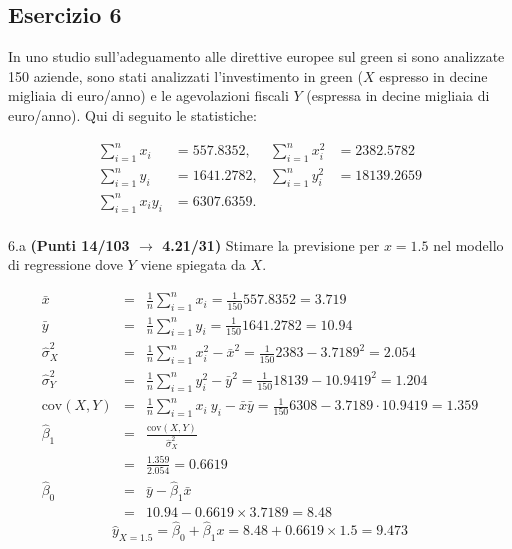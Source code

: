 \documentclass[
  11pt,
]{book}
\theoremstyle{mytheoremstyle}
\theoremstyle{mydefstyle}
\newenvironment{sol}
  {
  \begin{tcolorbox}[enhanced,breakable,arc=0.1mm,boxrule=1pt,colback=white,colframe=iblue,
  title=\bf \fontfamily{lmss}\selectfont \hspace{.5 cm} Soluzione,drop fuzzy shadow]

}{
\end{tcolorbox}
  }
\begin{document}
\subsection{Esercizio 6}\label{esercizio-6-22}

In uno studio sull'adeguamento alle direttive europee sul green si sono analizzate 150 aziende, sono stati analizzati l'investimento in green (\(X\) espresso in decine migliaia di euro/anno) e le agevolazioni fiscali \(Y\) (espressa in decine migliaia di euro/anno). Qui di seguito le statistiche:

\begin{align*}
\sum_{i=1}^n x_i &= 557.8352,   &\sum_{i=1}^n x_i^2 &= 2382.5782 \\
\sum_{i=1}^n y_i &= 1641.2782,   &\sum_{i=1}^n y_i^2 &= 18139.2659 \\
\sum_{i=1}^n x_iy_i &= 6307.6359.    \\
\end{align*}

6.a \textbf{(Punti 14/103 \(\rightarrow\) 4.21/31)} Stimare la previsione per \(x=1.5\) nel modello di regressione dove \(Y\) viene spiegata da \(X\).

\begin{sol}
\begin{eqnarray*}
           \bar x &=&\frac 1 n\sum_{i=1}^n x_i = \frac {1}{ 150 }  557.8352 =  3.719 \\
           \bar y &=&\frac 1 n\sum_{i=1}^n y_i = \frac {1}{ 150 }  1641.2782 =  10.94 \\
           \hat\sigma_X^2&=&\frac 1 n\sum_{i=1}^n x_i^2-\bar x^2=\frac {1}{ 150 }  2383  - 3.7189 ^2= 2.054 \\
           \hat\sigma_Y^2&=&\frac 1 n\sum_{i=1}^n y_i^2-\bar y^2=\frac {1}{ 150 }  18139  - 10.9419 ^2= 1.204 \\
           \text{cov}(X,Y)&=&\frac 1 n\sum_{i=1}^n x_i~y_i-\bar x\bar y=\frac {1}{ 150 }  6308 - 3.7189 \cdot 10.9419 = 1.359 \\
           \hat\beta_1 &=& \frac{\text{cov}(X,Y)}{\hat\sigma_X^2} \\
                    &=& \frac{ 1.359 }{ 2.054 }  =  0.6619 \\
           \hat\beta_0 &=& \bar y - \hat\beta_1 \bar x\\
                    &=&  10.94 - 0.6619 \times  3.7189 = 8.48 
         \end{eqnarray*}\[\hat y_{X= 1.5 }=\hat\beta_0+\hat\beta_1 x= 8.48 + 0.6619 \times 1.5 = 9.473 \]

\end{sol}
\end{document}
